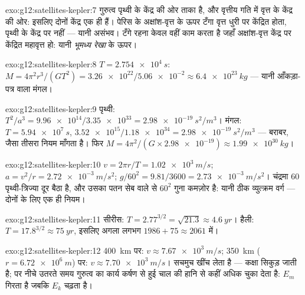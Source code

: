 \begin{solution}{exo:g12:satellites-kepler:7}
गुरुत्व पृथ्वी के केंद्र की ओर ताका है, और वृत्तीय गति में 
वृत्त के केंद्र की ओर: इसलिए दोनों केंद्र एक ही हैं। पेरिस के अक्षांश-वृत्त के
ऊपर टँगा वृत्त धुरी पर केंद्रित होता, पृथ्वी के केंद्र पर नहीं --- यानी असंभव।
टँगे रहना केवल वहीं काम करता है जहाँ अक्षांश-वृत्त केंद्र पर केंद्रित
महावृत्त हो: यानी \emph{भूमध्य रेखा} के ऊपर।
\end{solution}

\begin{solution}{exo:g12:satellites-kepler:8}
$T = \qty{2.754e4}{s}$: $M = 4\pi^2 r^3/(GT^2) =
\num{3.26e22}/\num{5.06e-2} \approx \qty{6.4e23}{kg}$ --- यानी आँकड़ा-पत्र वाला मंगल।
\end{solution}

\begin{solution}{exo:g12:satellites-kepler:9}
पृथ्वी: $T^2/a^3 = \num{9.96e14}/\num{3.35e33} =
\qty{2.98e-19}{s^2/m^3}$। मंगल: $T = \qty{5.94e7}{s}$, $\num{3.52e15}/\num{1.18e34} = \qty{2.98e-19}{s^2/m^3}$ --- बराबर, जैसा तीसरा नियम माँगता है। फिर
$M = 4\pi^2/(G \times \num{2.98e-19})
\approx \qty{1.99e30}{kg}$।
\end{solution}

\begin{solution}{exo:g12:satellites-kepler:10}
$v = 2\pi r/T = \qty{1.02e3}{m/s}$; $a = v^2/r =
\qty{2.72e-3}{m/s^2}$; $g/60^2 = 9.81/3600 = \qty{2.73e-3}{m/s^2}$। चंद्रमा $60$ पृथ्वी-त्रिज्या दूर बैठा है, और उसका
पतन सेब वाले से $60^2$ गुना कमज़ोर है: यानी ठीक व्युत्क्रम वर्ग --- दोनों के
लिए एक ही नियम।
\end{solution}

\begin{solution}{exo:g12:satellites-kepler:11}
सीरीस: $T = 2.77^{3/2} = \sqrt{21.3} \approx \qty{4.6}{yr}$। हैली: $T = 17.8^{3/2} \approx \qty{75}{yr}$, इसलिए अगला  लगभग $1986 + 75 \approx 2061$ में।
\end{solution}

\begin{solution}{exo:g12:satellites-kepler:12}
\qty{400}{km} पर: $v \approx \qty{7.67e3}{m/s}$; \qty{350}{km} ($r = \qty{6.72e6}{m}$) पर: $v \approx \qty{7.70e3}{m/s}$।  सचमुच
 खींच लेता है --- कक्षा सिकुड़ जाती है; पर नीचे
उतरते समय गुरुत्व का कार्य कर्षण से हुई चाल की हानि से कहीं अधिक चुका
देता है: $E_m$ गिरता है जबकि $E_k$ चढ़ता है।
\end{solution}

